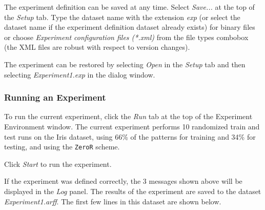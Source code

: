 The experiment definition can be saved at any time. Select \textit{Save...} at the top of the \textit{Setup} tab. Type the dataset name with the extension \textit{exp} (or select the dataset name if the experiment definition dataset already exists) for binary files or choose \textit{Experiment configuration files (*.xml)} from the file types combobox (the XML files are robust with respect to version changes).
\begin{center}
\end{center}


The experiment can be restored by selecting \textit{Open} in the \textit{Setup} tab and then selecting \textit{Experiment1.exp} in the dialog window.



\subsubsection{Running an Experiment}

To run the current experiment, click the \textit{Run} tab at the top of the Experiment Environment window. The current experiment performs 10 randomized train and test runs on the Iris dataset, using 66\% of the patterns for training and 34\% for testing, and using the \texttt{ZeroR} scheme.
\begin{center}
\end{center}

Click \textit{Start} to run the experiment.
\begin{center}
\end{center}

If the experiment was defined correctly, the 3 messages shown above will be displayed in the \textit{Log} panel. The results of the experiment are saved to the dataset \textit{Experiment1.arff}. The first few lines in this dataset are shown below.

